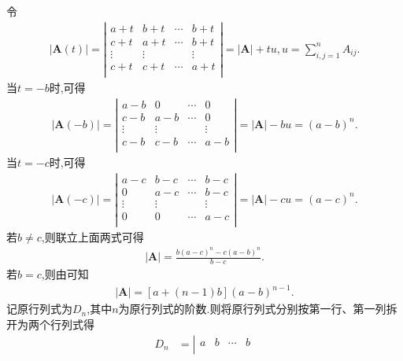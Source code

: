 \documentclass[../../main.tex]{subfiles}
\begin{document}
\begin{solution}
{\color{blue}}
令
\begin{align*}
|\boldsymbol{A}(t)|=\left| \begin{matrix}
a+t&		b+t&		\cdots&		b+t\\
c+t&		a+t&		\cdots&		b+t\\
\vdots&		\vdots&		&		\vdots\\
c+t&		c+t&		\cdots&		a+t\\
\end{matrix} \right|=|\boldsymbol{A}|+tu,  u=\sum_{i,j=1}^n{A_{ij}.}
\nonumber
\end{align*}
当$t=-b$时,可得
\begin{align*}
|\boldsymbol{A}(-b)|=\left| \begin{matrix}
a-b&		0&		\cdots&		0\\
c-b&		a-b&		\cdots&		0\\
\vdots&		\vdots&		&		\vdots\\
c-b&		c-b&		\cdots&		a-b\\
\end{matrix} \right|=|\boldsymbol{A}|-bu=(a-b)^n.
\end{align*}
当$t=-c$时,可得
\begin{align*}
|\boldsymbol{A}(-c)|=\left| \begin{matrix}
a-c&		b-c&		\cdots&		b-c\\
0&		a-c&		\cdots&		b-c\\
\vdots&		\vdots&		&		\vdots\\
0&		0&		\cdots&		a-c\\
\end{matrix} \right|=|\boldsymbol{A}|-cu=(a-c)^n.
\end{align*}
若$b\ne c$,则联立上面两式可得
\begin{align}\label{eq:::2343135--fdg-13-12-3d}
\left| \boldsymbol{A} \right|=\frac{b\left( a-c \right) ^n-c\left( a-b \right) ^n}{b-c}.
\end{align}
若$b=c$,则由可知
\begin{align*}
|\boldsymbol{A}|=\left[ a+\left( n-1 \right) b \right] \left( a-b \right) ^{n-1}.
\end{align*}
{\color{blue}}
记原行列式为$D_n$,其中$n$为原行列式的阶数.则将原行列式分别按第一行、第一列拆开为两个行列式得
\begin{align*}
D_n&=\left| \begin{matrix}
a&		b&		\cdots&		b\\

\end{matrix}
\end{align*}
\end{solution}
\end{document}
